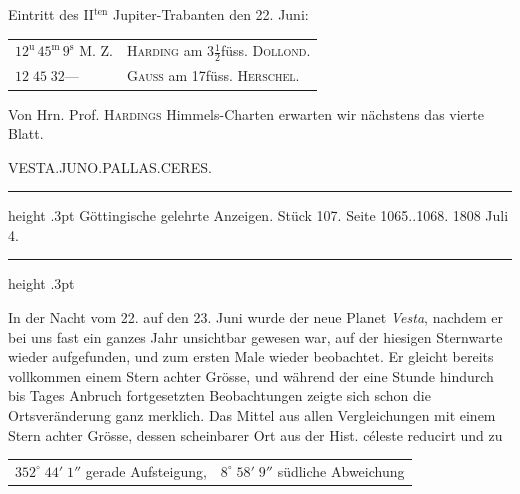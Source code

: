 \par\indent Eintritt des II$^{\text{ten}}$ Jupiter-Trabanten den 22. Juni:


\begin{center}\fontsize{10}{12}\selectfont\setlength{\tabcolsep}{3pt}\renewcommand{\arraystretch}{1.15}\begin{tabular}{ll}
$12^{\text{u}}\,45^{\text{m}}\,9^{\text{s}}$ M. Z. & \textsc{Harding} am $3\frac{1}{2}$füss. \textsc{Dollond}.\\
$12\;45\;32$\quad — & \textsc{Gauss} am 17füss. \textsc{Herschel}.\\
\end{tabular}\end{center}


\par\indent Von Hrn. Prof. \textsc{Hardings} Himmels-Charten erwarten wir nächstens das vierte Blatt.

\par\bigskip
{}
\begin{center}
\large VESTA.\enspace JUNO.\enspace PALLAS.\enspace CERES.
\end{center}

\begin{center}
\parbox{.76\linewidth}{%
\centering\fontsize{8.2}{10.2}\selectfont
\hrule height .3pt\relax\vspace{2.5pt}
Göttingische gelehrte Anzeigen. Stück 107. Seite 1065..1068. 1808 Juli 4.\par
\vspace{2.5pt}\hrule height .3pt\relax
}
\end{center}

\par\indent In der Nacht vom 22. auf den 23. Juni wurde der neue Planet \emph{Vesta}, nachdem er
bei uns fast ein ganzes Jahr unsichtbar gewesen war, auf der hiesigen Sternwarte
wieder aufgefunden, und zum ersten Male wieder beobachtet. Er gleicht bereits
vollkommen einem Stern achter Grösse, und während der eine Stunde hindurch bis Tages
Anbruch fortgesetzten Beobachtungen zeigte sich schon die Ortsveränderung ganz
merklich. Das Mittel aus allen Vergleichungen mit einem Stern achter Grösse, dessen
scheinbarer Ort aus der Hist. céleste reducirt und zu


\begin{center}\fontsize{10}{12}\selectfont\setlength{\tabcolsep}{3pt}\renewcommand{\arraystretch}{1.15}\begin{tabular}{@{}l@{\qquad}l@{}}
$352^\circ\;44'\;1''$ gerade Aufsteigung, & $8^\circ\;58'\;9''$ südliche Abweichung
\end{tabular}\end{center}


